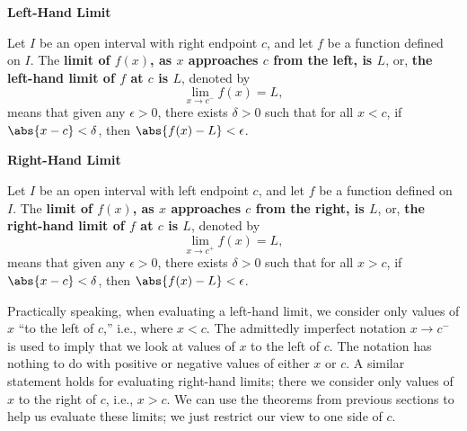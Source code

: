 \begin{definition}\label{def:onesidedlimit}
\textbf{Left-Hand Limit} 

Let $I$ be an open interval with right endpoint $c$, and let $f$ be a function defined on $I$. %
The \textbf{limit of $f(x)$, as $x$ approaches $c$ from the left, is $L$}, or, \textbf{the left-hand limit of $f$ at $c$ is $L$}, denoted by  
\[\lim_{x\rightarrow c^-} f(x) = L,\]
means that given any $\epsilon > 0$, there exists $\delta > 0$ such that for all $x< c$,  
if  $\abs{x-c}<\delta$, then $\abs{f(x)-L}<\epsilon$.\bigskip

\textbf{Right-Hand Limit}

Let $I$ be an open interval with left endpoint $c$, and let $f$ be a function defined on $I$. %
The \textbf{limit of $f(x)$, as $x$ approaches $c$ from the right, is $L$}, or, \textbf{the right-hand limit of $f$ at $c$ is $L$}, denoted by  
\[\lim_{x\rightarrow c^+} f(x) = L,\]
means that given any $\epsilon > 0$, there exists $\delta > 0$ such that for all $x> c$,  
if  $\abs{x-c}<\delta$, then $\abs{f(x)-L}<\epsilon$.
\end{definition}

Practically speaking, when evaluating a left-hand limit, we consider only values of $x$ ``to the left of $c$,'' i.e., where $x<c$. The admittedly imperfect notation $x\to c^-$ is used to imply that we look at values of $x$ to the left of $c$. The notation has nothing to do with positive or negative values of either $x$ or $c$. A similar statement holds for evaluating right-hand limits; there we consider only values of $x$ to the right of $c$, i.e., $x>c$. We can use the theorems from previous sections to help us evaluate these limits; we just restrict our view to one side of $c$.

